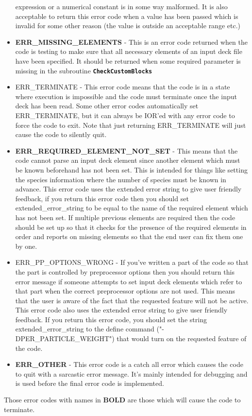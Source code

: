 \documentclass[12pt,a4paper]{article}
\newcommand{\inlinecode}[1]{{\color{warwickred} \bf\texttt{#1}}}
\begin{document}
\begin{itemize}
  expression or a numerical constant is in some way malformed. It is also
  acceptable to return this error code when a value has been passed which is
  invalid for some other reason (the value is outside an acceptable range etc.)
\item {\bf ERR\_MISSING\_ELEMENTS} - This is an error code returned when the
  code is testing to make sure that all necessary elements of an input deck
  file have been specified. It should be returned when some required parameter
  is missing in the subroutine \inlinecode{CheckCustomBlocks}
\item ERR\_TERMINATE - This error code means that the code is in a state where
  execution is impossible and the code must terminate once the input deck has
  been read. Some other error codes automatically set ERR\_TERMINATE, but it
  can always be IOR'ed with any error code to force the code to exit. Note that
  just returning ERR\_TERMINATE will just cause the code to silently quit.
\item {\bf ERR\_REQUIRED\_ELEMENT\_NOT\_SET} - This means that the code cannot
  parse an input deck element since another element which must be known
  beforehand has not been set. This is intended for things like setting the
  species information where the number of species must be known in
  advance. This error code uses the extended error string to give user friendly
  feedback, if you return this error code then you should set
  extended\_error\_string to be equal to the name of the required element which
  has not been set. If multiple previous elements are required then the code
  should be set up so that it checks for the presence of the required elements
  in order and reports on missing elements so that the end user can fix them
  one by one.
\item ERR\_PP\_OPTIONS\_WRONG - If you've written a part of the code so that
  the part is controlled by preprocessor options then you should return this
  error message if someone attempts to set input deck elements which refer to
  that part when the correct preprocessor options are not used. This means that
  the user is aware of the fact that the requested feature will not be
  active. This error code also uses the extended error string to give user
  friendly feedback. If you return this error code, you should set the string
  extended\_error\_string to the define command ("-DPER\_PARTICLE\_WEIGHT")
  that would turn on the requested feature of the code.
\item {\bf ERR\_OTHER} - This error code is a catch all error which causes the
  code to quit with a sarcastic error message. It's mainly intended for
  debugging and is used before the final error code is implemented.
\end{itemize}

Those error codes with names in {\bf BOLD} are those which will cause the code
to terminate.
\end{document}
